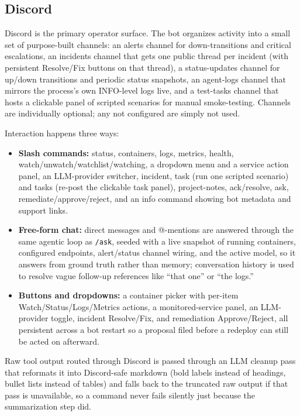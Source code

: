 \documentclass[11pt]{article}
\begin{document}
\subsection{Discord}

Discord is the primary operator surface. The bot organizes activity into a
small set of purpose-built channels: an alerts channel for down-transitions
and critical escalations, an incidents channel that gets one public thread
per incident (with persistent Resolve/Fix buttons on that thread), a
status-updates channel for up/down transitions and periodic status
snapshots, an agent-logs channel that mirrors the process's own INFO-level
logs live, and a test-tasks channel that hosts a clickable panel of
scripted scenarios for manual smoke-testing. Channels are individually
optional; any not configured are simply not used.

Interaction happens three ways:

\begin{itemize}
  \item \textbf{Slash commands:} status, containers, logs, metrics, health,
    watch/unwatch/watchlist/watching, a dropdown menu and a service action
    panel, an LLM-provider switcher, incident, task (run one scripted
    scenario) and tasks (re-post the clickable task panel), project-notes,
    ack/resolve, ask, remediate/approve/reject, and an info command showing
    bot metadata and support links.
  \item \textbf{Free-form chat:} direct messages and @-mentions are
    answered through the same agentic loop as \texttt{/ask}, seeded with a
    live snapshot of running containers, configured endpoints, alert/status
    channel wiring, and the active model, so it answers from ground truth
    rather than memory; conversation history is used to resolve vague
    follow-up references like ``that one'' or ``the logs.''
  \item \textbf{Buttons and dropdowns:} a container picker with per-item
    Watch/Status/Logs/Metrics actions, a monitored-service panel, an
    LLM-provider toggle, incident Resolve/Fix, and remediation
    Approve/Reject, all persistent across a bot restart so a proposal filed
    before a redeploy can still be acted on afterward.
\end{itemize}

Raw tool output routed through Discord is passed through an LLM cleanup pass
that reformats it into Discord-safe markdown (bold labels instead of
headings, bullet lists instead of tables) and falls back to the truncated
raw output if that pass is unavailable, so a command never fails silently
just because the summarization step did.
\end{document}
